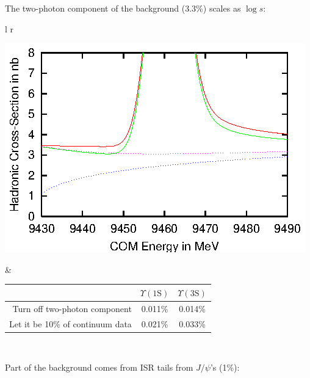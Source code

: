 \begin{slide*}
\begin{minipage}[t]{\linewidth}
\vspace{1cm}
The two-photon component of the background (3.3\%) scales as $\log s$:

\begin{center}
  \begin{tabular}{l r}
    \begin{minipage}{0.25\linewidth}
      \includegraphics[width=\linewidth]{fakedback_lineshape.eps}
    \end{minipage} &
    \begin{minipage}{0.6\linewidth}
      \begin{center}
        \begin{tabular}{r | c | c}
          & $\Upsilon(\mbox{1S})$ & $\Upsilon(\mbox{3S})$ \\\hline
	  Turn off two-photon component & 0.011\% & 0.014\% \\
	  Let it be 10\% of continuum data & 0.021\% & 0.033\% \\
        \end{tabular}
      \end{center}
    \end{minipage} \\
  \end{tabular}
\end{center}

\vspace{1cm}
Part of the background comes from ISR tails from $J/\psi$'s (1\%):


\end{minipage}
\end{slide*}
